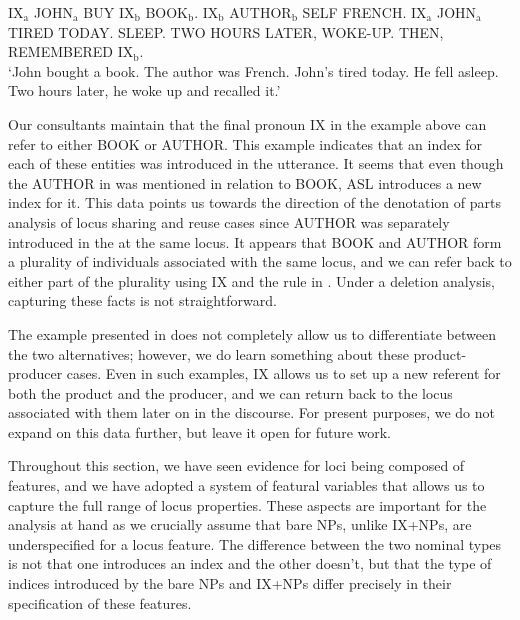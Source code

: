 \documentclass[output=paper,
modfonts
]{langscibook}
\begin{document}
\begin{exe} 
	\ex \label{ex:irani:82} IX$_\text{a}$ JOHN$_\text{a}$ BUY IX$_\text{b}$ BOOK$_\text{b}$. IX$_\text{b}$ AUTHOR$_\text{b}$ SELF FRENCH. IX$_\text{a}$ JOHN$_\text{a}$ TIRED TODAY. SLEEP. TWO HOURS LATER, WOKE-UP. THEN, REMEMBERED IX$_\text{b}$. \\
	`John bought a book. The author was French. John's tired today. He fell asleep. Two hours later, he woke up and recalled it.'
\end{exe} 

Our consultants maintain that the final pronoun IX in the example above can refer to either BOOK or AUTHOR. This example indicates that an index for each of these entities was introduced in the utterance. It seems that even though the AUTHOR in  was mentioned in relation to BOOK, ASL introduces a new index for it. This data points us towards the direction of the denotation of parts analysis of locus sharing and reuse cases since AUTHOR was separately introduced in the  at the same locus. It appears that BOOK and AUTHOR form a plurality of individuals associated with the same locus, and we can refer back to either part of the plurality using IX and the rule in . Under a deletion analysis, capturing these facts is not straightforward. 

The example presented in  does not completely allow us to differentiate between the two alternatives; however, we do learn something about these product-producer  cases. Even in such examples, IX allows us to set up a new referent for both the product and the producer, and we can return back to the locus associated with them later on in the discourse. For present purposes, we do not expand on this data further, but leave it open for future work. 

Throughout this section, we have seen evidence for loci being composed of features, and we have adopted a system of featural variables that allows us to capture the full range of locus properties. These aspects are important for the analysis at hand as we crucially assume that bare NPs, unlike IX+NPs, are underspecified for a locus feature. The difference between the two nominal types is not that one introduces an index and the other doesn't, but that the type of indices introduced by the bare NPs and IX+NPs differ precisely in their specification of these features. 
\end{document}
